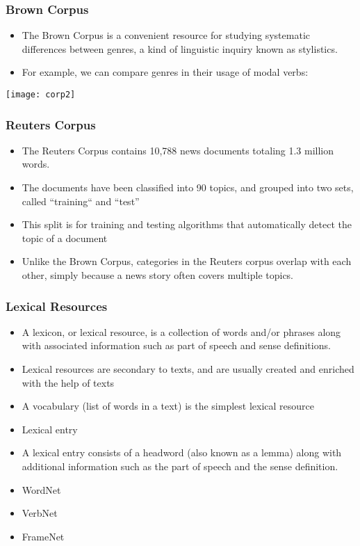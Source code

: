 \begin{frame}[fragile]\frametitle{Brown Corpus}
\begin{itemize}
\item The Brown Corpus is a convenient resource for studying systematic differences between genres, a kind of linguistic inquiry known as stylistics.
\item For example, we can compare genres in their usage of modal verbs:
\end{itemize}
\begin{center}
\texttt{[image: corp2]}
\end{center}
\end{frame}

\begin{frame}[fragile]\frametitle{Reuters Corpus}
\begin{itemize}
\item The Reuters Corpus contains 10,788 news documents totaling 1.3 million words. 
\item The documents have been classified into 90 topics, and grouped into two sets, called ``training`` and ``test''
\item This split is for training and testing algorithms that automatically detect the topic of a document
\item Unlike the Brown Corpus, categories in the Reuters corpus overlap with each other, simply because a news story often covers multiple topics. 
\end{itemize}
\end{frame}

\begin{frame}[fragile]\frametitle{ Lexical Resources }
\begin{itemize}
\item A lexicon, or lexical resource, is a collection of words and/or phrases along with associated information such as part of speech and sense definitions. 
\item Lexical resources are secondary to texts, and are usually created and enriched with the help of texts 
\item A vocabulary (list of words in a text) is the simplest lexical resource
\item Lexical entry
\item A lexical entry consists of a headword (also known as a lemma) along with additional information such as the part of speech and the sense definition. 
\item WordNet
\item VerbNet
\item FrameNet
\end{itemize}
\end{frame}




